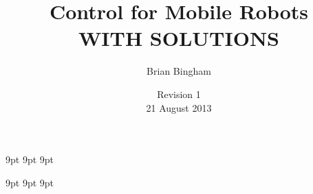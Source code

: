 \documentclass[11pt]{book}
\begin{document}
\newif\ifsolutions
\solutionstrue  %

\graphicspath{{./}{../figs/}}

%

\newcommand{\bmcode}{\begin{lstlisting}[style=myMatStyle]}
\newcommand{\emcode}{\end{lstlisting}}

\newcommand{\SF}{0.2}
\newcommand{\SFb}{0.3}

\newcommand{\FigWidth}{0.7}
\newcommand{\ThisFigWidth}{0.7}

\newcommand{\scaleOneTwo}[2] {\scalebox{#2}}

\graphicspath{{../figs/}}


     {9pt}%
     {9pt}%
     {\itshape}%
     {}%
     {\bfseries}%
     {}%
     {9pt}%
     {}%


\theoremstyle{myex}
\newtheorem{ex}{Exercise}[chapter]

     {9pt}%
     {9pt}%
     {\itshape}%
     {}%
     {\bfseries}%
     {}%
     {9pt}%
     {}%

\theoremstyle{mysoln}
\newtheorem*{soln}{Solution}

\frontmatter
\ifsolutions
\newcommand{\thetitle}{Control for Mobile Robots \\ WITH SOLUTIONS}
\else
\newcommand{\thetitle}{Control for Mobile Robots}
\fi
\title{\thetitle}
\author{Brian Bingham}
\date{Revision 1\\21 August 2013}
\end{document}

